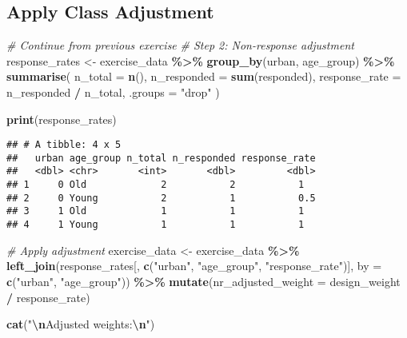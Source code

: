 \documentclass[
]{article}
\newenvironment{Shaded}{\begin{snugshade}}{\end{snugshade}}
\newcommand{\AttributeTok}[1]{\textcolor[rgb]{0.13,0.29,0.53}{#1}}
\newcommand{\CommentTok}[1]{\textcolor[rgb]{0.56,0.35,0.01}{\textit{#1}}}
\newcommand{\FunctionTok}[1]{\textcolor[rgb]{0.13,0.29,0.53}{\textbf{#1}}}
\newcommand{\NormalTok}[1]{#1}
\newcommand{\OtherTok}[1]{\textcolor[rgb]{0.56,0.35,0.01}{#1}}
\newcommand{\SpecialCharTok}[1]{\textcolor[rgb]{0.81,0.36,0.00}{\textbf{#1}}}
\newcommand{\StringTok}[1]{\textcolor[rgb]{0.31,0.60,0.02}{#1}}
\begin{document}
\subsection{Apply Class Adjustment}\label{apply-class-adjustment}

\begin{Shaded}
\begin{Highlighting}[]
\CommentTok{\# Continue from previous exercise}
\CommentTok{\# Step 2: Non{-}response adjustment}
\NormalTok{response\_rates }\OtherTok{\textless{}{-}}\NormalTok{ exercise\_data }\SpecialCharTok{\%\textgreater{}\%}
  \FunctionTok{group\_by}\NormalTok{(urban, age\_group) }\SpecialCharTok{\%\textgreater{}\%}
  \FunctionTok{summarise}\NormalTok{(}
    \AttributeTok{n\_total =} \FunctionTok{n}\NormalTok{(),}
    \AttributeTok{n\_responded =} \FunctionTok{sum}\NormalTok{(responded),}
    \AttributeTok{response\_rate =}\NormalTok{ n\_responded }\SpecialCharTok{/}\NormalTok{ n\_total,}
    \AttributeTok{.groups =} \StringTok{"drop"}
\NormalTok{  )}

\FunctionTok{print}\NormalTok{(response\_rates)}
\end{Highlighting}
\end{Shaded}

\begin{verbatim}
## # A tibble: 4 x 5
##   urban age_group n_total n_responded response_rate
##   <dbl> <chr>       <int>       <dbl>         <dbl>
## 1     0 Old             2           2           1  
## 2     0 Young           2           1           0.5
## 3     1 Old             1           1           1  
## 4     1 Young           1           1           1
\end{verbatim}

\begin{Shaded}
\begin{Highlighting}[]
\CommentTok{\# Apply adjustment}
\NormalTok{exercise\_data }\OtherTok{\textless{}{-}}\NormalTok{ exercise\_data }\SpecialCharTok{\%\textgreater{}\%}
  \FunctionTok{left\_join}\NormalTok{(response\_rates[, }\FunctionTok{c}\NormalTok{(}\StringTok{"urban"}\NormalTok{, }\StringTok{"age\_group"}\NormalTok{, }\StringTok{"response\_rate"}\NormalTok{)],}
            \AttributeTok{by =} \FunctionTok{c}\NormalTok{(}\StringTok{"urban"}\NormalTok{, }\StringTok{"age\_group"}\NormalTok{)) }\SpecialCharTok{\%\textgreater{}\%}
  \FunctionTok{mutate}\NormalTok{(}\AttributeTok{nr\_adjusted\_weight =}\NormalTok{ design\_weight }\SpecialCharTok{/}\NormalTok{ response\_rate)}

\FunctionTok{cat}\NormalTok{(}\StringTok{"}\SpecialCharTok{\textbackslash{}n}\StringTok{Adjusted weights:}\SpecialCharTok{\textbackslash{}n}\StringTok{"}\NormalTok{)}
\end{Highlighting}
\end{Shaded}
\end{document}
